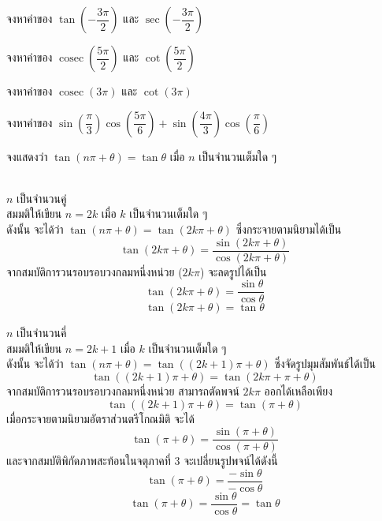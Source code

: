 \begin{examplebox}
	จงหาค่าของ $\tan\left(-\dfrac{3\pi}{2}\right)$ และ $\sec\left(-\dfrac{3\pi}{2}\right)$
\end{examplebox}
\solution
\newpage

\begin{examplebox}
	จงหาค่าของ $\operatorname{cosec}\left(\dfrac{5\pi}{2}\right)$ และ $\cot\left(\dfrac{5\pi}{2}\right)$
\end{examplebox}
\solution
\vspace{5cm}

\begin{examplebox}
	จงหาค่าของ $\operatorname{cosec}(3\pi)$ และ $\operatorname{\cot}(3\pi)$
	\end{examplebox}
	\solution
	\vspace{5cm}
	
\begin{examplebox}
จงหาค่าของ $\sin\left(\dfrac{\pi}{3}\right)\cos\left(\dfrac{5\pi}{6}\right) + \sin\left(\dfrac{4\pi}{3}\right)\cos\left(\dfrac{\pi}{6}\right)$
\end{examplebox}
\solution
\newpage

\begin{examplebox}
	จงแสดงว่า $\tan(n\pi + \theta) = \tan\theta$ เมื่อ $n$ เป็นจำนวนเต็มใด ๆ
\end{examplebox}
\proof
\vspace{0.5em}\\
\case $n$ เป็นจำนวนคู่
\\
สมมติให้เขียน $n = 2k$ เมื่อ $k$ เป็นจำนวนเต็มใด ๆ
\\
ดังนั้น จะได้ว่า $\tan(n\pi + \theta) = \tan(2k\pi + \theta)$ ซึ่งกระจายตามนิยามได้เป็น
$$\tan(2k\pi + \theta) = \dfrac{\sin(2k\pi + \theta)}{\cos(2k\pi + \theta)}$$
จากสมบัติการวนรอบรอบวงกลมหนึ่งหน่วย ($2k\pi$) จะลดรูปได้เป็น
$$\tan(2k\pi + \theta) = \dfrac{\sin\theta}{\cos\theta}$$
$$\tan(2k\pi + \theta) = \tan\theta$$

\case $n$ เป็นจำนวนคี่
\\
สมมติให้เขียน $n = 2k + 1$ เมื่อ $k$ เป็นจำนวนเต็มใด ๆ
\\
ดังนั้น จะได้ว่า $\tan(n\pi + \theta) = \tan((2k + 1)\pi + \theta)$ ซึ่งจัดรูปมุมสัมพันธ์ได้เป็น
$$\tan((2k + 1)\pi + \theta) = \tan(2k\pi + \pi + \theta)$$
จากสมบัติการวนรอบรอบวงกลมหนึ่งหน่วย สามารถตัดพจน์ $2k\pi$ ออกได้เหลือเพียง
$$\tan((2k + 1)\pi + \theta) = \tan(\pi + \theta)$$
เมื่อกระจายตามนิยามอัตราส่วนตรีโกณมิติ จะได้
$$\tan(\pi + \theta) = \dfrac{\sin(\pi + \theta)}{\cos(\pi + \theta)}$$
และจากสมบัติพิกัดภาพสะท้อนในจตุภาคที่ 3 จะเปลี่ยนรูปพจน์ได้ดังนี้
$$\tan(\pi + \theta) = \dfrac{-\sin\theta}{-\cos\theta}$$
$$\tan(\pi + \theta) = \dfrac{\sin\theta}{\cos\theta} = \tan\theta$$

